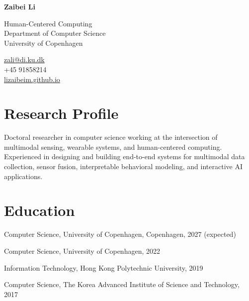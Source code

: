 \documentclass[11pt,letterpaper]{report}
\newcommand{\myname}{Zaibei Li}
\newcommand{\namefont}[1]{{\normalfont\bfseries\Huge{#1}}}
\begin{document}
    \raggedright{}

    \namefont{\myname}

    \vspace{1em}
    \begin{minipage}[t]{0.700\textwidth}
        Human-Centered Computing\\
        Department of Computer Science\\
        University of Copenhagen
    \end{minipage}
    \begin{minipage}[t]{0.295\textwidth}
        \flushright{}
        \href{mailto:zali@di.ku.dk}{zali@di.ku.dk} \\
        +45 91858214 \\
        \href{https://lizaibeim.github.io}{lizaibeim.github.io}
    \end{minipage}

    \section*{Research Profile}

    Doctoral researcher in computer science working at the intersection of multimodal sensing, wearable systems, and human-centered computing. Experienced in designing and building end-to-end systems for multimodal data collection, sensor fusion, interpretable behavioral modeling, and interactive AI applications.

    \section*{Education}

    \begin{tablist}
        \item[Ph.D.] \tab{}Computer Science, University of Copenhagen, Copenhagen, 2027 (expected)
        \item[M.S.]  \tab{}Computer Science, University of Copenhagen, 2022
        \item[B.S.]  \tab{}Information Technology, Hong Kong Polytechnic University, 2019
        \item[Exchange]  \tab{}Computer Science, The Korea Advanced Institute of Science and Technology, 2017
    \end{tablist}
\end{document}
